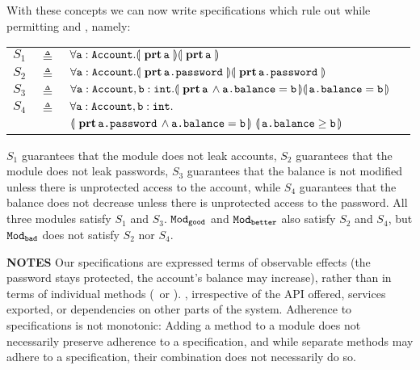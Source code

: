With these concepts we can now write specifications which  rule  out \ModB while permitting \ModA and
\ModC, namely:
\label{s:bankSpecEx}

  
 \begin{tabular}{lcll}
 $S_1$   & $\triangleq$   &  $\forall {{\texttt{a}}:{\texttt{Account}}}.{\llparenthesis}\, {\, \mathbf{prt}\, {\texttt{a}}\, } \,{\rrparenthesis}{\llparenthesis}\, {\, \mathbf{prt}\, {\texttt{a}}\, } \,{\rrparenthesis}$
 \\
 $S_2$   & $\triangleq$   &  $\forall {{\texttt{a}}:{\texttt{Account}}}.{\llparenthesis}\, {\, \mathbf{prt}\, {\texttt{a.password}}\, } \,{\rrparenthesis}{\llparenthesis}\, {\, \mathbf{prt}\, {\texttt{a.password}}\, } \,{\rrparenthesis}$
 \\
 $S_3$ & $\triangleq$   &
 $ \forall {{\texttt{a}}:{\texttt{Account}},{\texttt{b}}:{\texttt{int}}}.{\llparenthesis}\, {\, \mathbf{prt}\, {\texttt{a}}\, } \wedge {\texttt{a.balance}}={\texttt{b}} \,{\rrparenthesis}{\llparenthesis}\,  {\texttt{a.balance}}={\texttt{b}}  \,{\rrparenthesis}$
\\
$S_4$ & $\triangleq$   &
  $\forall {\texttt{a}}:{\texttt{Account}},{\texttt{b}}:{\texttt{int}}.$\\
  &  &  ${\llparenthesis}\, {\, \mathbf{prt}\, {\texttt{a.password}}\, } \wedge {\texttt{a.balance}}={\texttt{b}} \,{\rrparenthesis} 
\  {\llparenthesis}\,  {\texttt{a.balance}}\geq {\texttt{b}}  \,{\rrparenthesis}$
 \end{tabular}




\noindent
 $S_1$ guarantees that the module does not leak accounts, 
 $S_2$ guarantees that the module does not leak passwords,
 $S_3$ guarantees that the balance is not modified unless there is unprotected access to the account, while 
 $S_4$ guarantees that the balance does not decrease unless there is unprotected access to the password.
 All three modules satisfy $S_1$ and $S_3$. ${\texttt{Mod}}_{{\texttt{good}}}$ and ${\texttt{Mod}}_{{\texttt{better}}}$ also satisfy $S_2$ and $S_4$, but ${\texttt{Mod}}_{{\texttt{bad}}}$ does not satisfy $S_2$ nor $S_4$.
 
 
 \noindent
\textbf{NOTES} \notesep  Our specifications are expressed terms of observable effects (\eg the password stays protected, the account's balance may increase), rather than in terms of individual methods (\eg\,  or ).
, irrespective of the API offered, services  exported, or  dependencies on other parts of the system.
\notesep
{Adherence to   specifications is not monotonic:
Adding a method to a module does not necessarily preserve adherence to
a specification, and while separate methods may adhere to a  specification, their combination does
not necessarily do so. 
}

